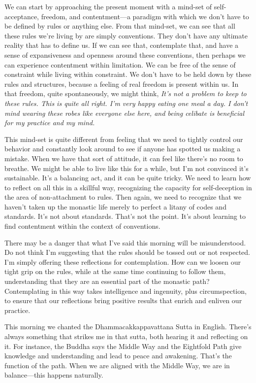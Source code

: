 We can start by approaching the present moment with a mind-set of 
self-acceptance, freedom, and contentment---a paradigm with which we 
don't have to be defined by rules or anything else. From that mind-set, 
we can see that all these rules we're living by are simply conventions. 
They don't have any ultimate reality that has to define us. If we can 
see that, contemplate that, and have a sense of expansiveness and 
openness around these conventions, then perhaps we can experience 
contentment within limitation. We can be free of the sense of 
constraint while living within constraint. We don't have to be held 
down by these rules and structures, because a feeling of real freedom 
is present within us. In that freedom, quite spontaneously, we might 
think, \emph{It's not a problem to keep to these rules. This is quite 
all right. I'm very happy eating one meal a day. I don't mind wearing 
these robes like everyone else here, and being celibate is beneficial 
for my practice and my mind.}

This mind-set is quite different from feeling that we need to tightly 
control our behavior and constantly look around to see if anyone has 
spotted us making a mistake. When we have that sort of attitude, it can 
feel like there's no room to breathe. We might be able to live like 
this for a while, but I'm not convinced it's sustainable. It's a 
balancing act, and it can be quite tricky. We need to learn how to 
reflect on all this in a skillful way, recognizing the capacity for 
self-deception in the area of non-attachment to rules. Then again, we 
need to recognize that we haven't taken up the monastic life merely to 
perfect a litany of codes and standards. It's not about standards. 
That's not the point. It's about learning to find contentment within 
the context of conventions.

There may be a danger that what I've said this morning will be
misunderstood. Do not think I'm suggesting that the rules should be
tossed out or not respected. I'm simply offering these reflections for
contemplation. How can we loosen our tight grip on the rules, while at
the same time continuing to follow them, understanding that they are an
essential part of the monastic path? Contemplating in this way takes
intelligence and \mbox{ingenuity,} plus circumspection, to ensure that
our reflections bring positive results that enrich and enliven our
practice.


This morning we chanted the Dhammacakkappavattana Sutta in English. 
There's always something that strikes me in that sutta, both hearing it 
and reflecting on it. For instance, the Buddha says the Middle Way and 
the Eightfold Path give knowledge and understanding and lead to peace 
and awakening. That's the function of the path. When we are aligned 
with the Middle Way, we are in balance---this happens naturally.

